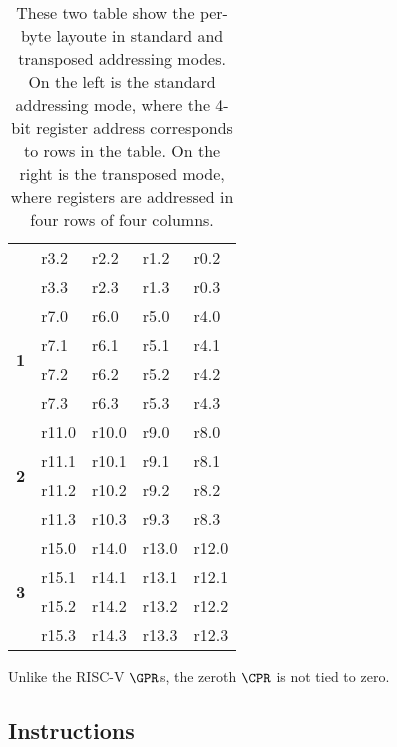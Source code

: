 \begin{table}[h!]
\begin{tabular}{|l|l|l|l|l|}
                                             & r3.2       & r2.2       & r1.2       & r0.2       \\
                                             & r3.3       & r2.3       & r1.3       & r0.3       \\ \hline
\multirow{4}{*}{\textbf{1}}                  & r7.0       & r6.0       & r5.0       & r4.0       \\
                                             & r7.1       & r6.1       & r5.1       & r4.1       \\
                                             & r7.2       & r6.2       & r5.2       & r4.2       \\
                                             & r7.3       & r6.3       & r5.3       & r4.3       \\ \hline
\multirow{4}{*}{\textbf{2}}                  & r11.0      & r10.0      & r9.0       & r8.0       \\
                                             & r11.1      & r10.1      & r9.1       & r8.1       \\
                                             & r11.2      & r10.2      & r9.2       & r8.2       \\
                                             & r11.3      & r10.3      & r9.3       & r8.3       \\ \hline
\multirow{4}{*}{\textbf{3}}                  & r15.0      & r14.0      & r13.0      & r12.0      \\
                                             & r15.1      & r14.1      & r13.1      & r12.1      \\
                                             & r15.2      & r14.2      & r13.2      & r12.2      \\
                                             & r15.3      & r14.3      & r13.3      & r12.3      \\ \hline
\end{tabular}
\caption{These two table show the per-byte layoute in standard and transposed
addressing modes. On the left is the standard addressing mode, where the
4-bit register address corresponds to rows in the table. On the right
is the transposed mode, where registers are addressed in four rows of
four columns.}
\label{tab:state-addr}
\end{table}

Unlike the RISC-V $\GPR$s, the zeroth $\CPR$ is not tied to zero.

\subsection{Instructions}

